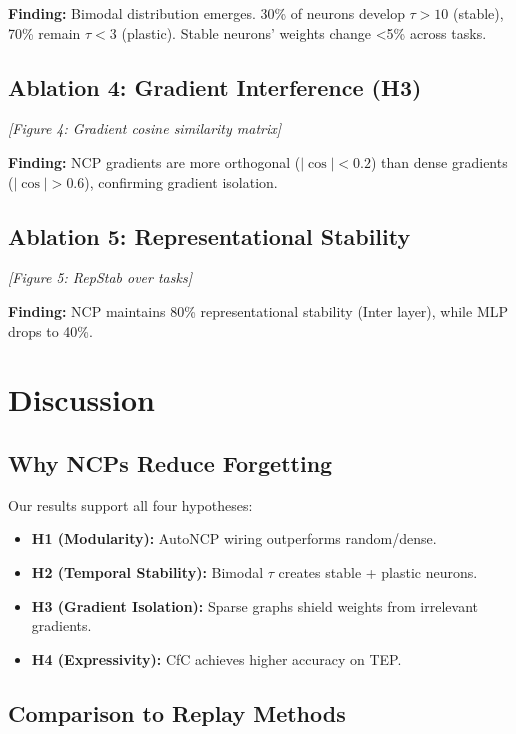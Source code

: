 \documentclass[11pt,twocolumn]{article}
\begin{document}
\textbf{Finding:} Bimodal distribution emerges. 30\% of neurons develop $\tau > 10$ (stable), 70\% remain $\tau < 3$ (plastic). Stable neurons' weights change <5\% across tasks.

\subsection{Ablation 4: Gradient Interference (H3)}

\textit{[Figure 4: Gradient cosine similarity matrix]}

\textbf{Finding:} NCP gradients are more orthogonal ($|\cos| < 0.2$) than dense gradients ($|\cos| > 0.6$), confirming gradient isolation.

\subsection{Ablation 5: Representational Stability}

\textit{[Figure 5: RepStab over tasks]}

\textbf{Finding:} NCP maintains 80\% representational stability (Inter layer), while MLP drops to 40\%.

\section{Discussion}

\subsection{Why NCPs Reduce Forgetting}

Our results support all four hypotheses:
\begin{itemize}
    \item \textbf{H1 (Modularity):} AutoNCP wiring outperforms random/dense.
    \item \textbf{H2 (Temporal Stability):} Bimodal $\tau$ creates stable + plastic neurons.
    \item \textbf{H3 (Gradient Isolation):} Sparse graphs shield weights from irrelevant gradients.
    \item \textbf{H4 (Expressivity):} CfC achieves higher accuracy on TEP.
\end{itemize}

\subsection{Comparison to Replay Methods}
\end{document}
